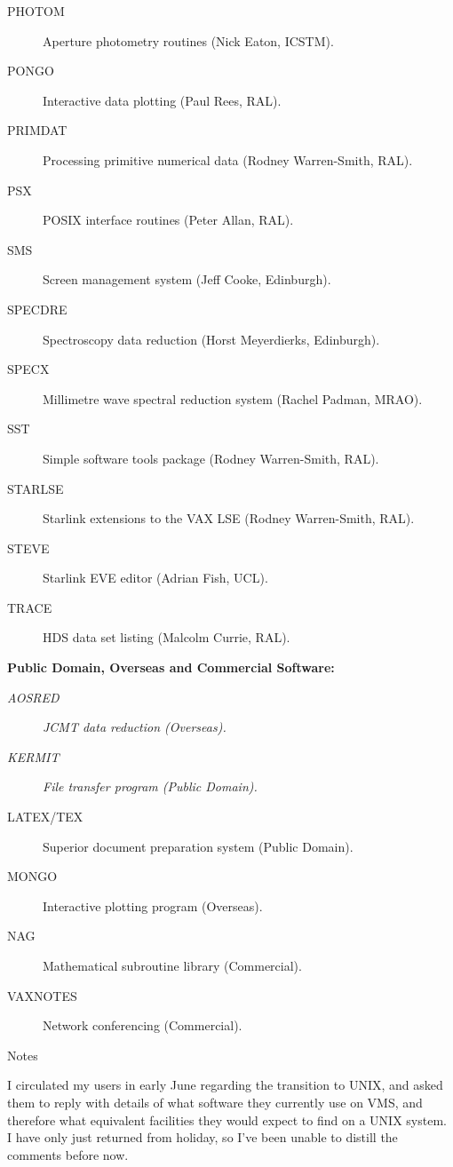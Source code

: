 \begin{description}
\item[PHOTOM] Aperture photometry routines (Nick Eaton, ICSTM).
\item[PONGO] Interactive data plotting (Paul Rees, RAL).
\item[PRIMDAT] Processing primitive numerical data (Rodney Warren-Smith, RAL).
\item[PSX] POSIX interface routines (Peter Allan, RAL).
\item[SMS] Screen management system (Jeff Cooke, Edinburgh).
\item[SPECDRE] Spectroscopy data reduction (Horst Meyerdierks, Edinburgh).
\item[SPECX] Millimetre wave spectral reduction system (Rachel Padman, MRAO).
\item[SST] Simple software tools package (Rodney Warren-Smith, RAL).
\item[STARLSE] Starlink extensions to the VAX LSE (Rodney Warren-Smith, RAL).
\item[STEVE] Starlink EVE editor (Adrian Fish, UCL).
\item[TRACE] HDS data set listing (Malcolm Currie, RAL).
\end{description}


\newpage
\vspace{5mm}
\begin{center}
{\bf Public Domain, Overseas and Commercial Software:}
\end{center}

\begin{description}
\item[{\em AOSRED}] {\em JCMT data reduction (Overseas).}
\item[{\em KERMIT}] {\em File transfer program (Public Domain).}
\item[LATEX/TEX] Superior document preparation system (Public Domain).
\item[MONGO] Interactive plotting program (Overseas).
\item[NAG] Mathematical subroutine library (Commercial).
\item[VAXNOTES] Network conferencing (Commercial).
\end{description}


\vspace{5mm}
\begin{center}
{\large\sc Notes}
\end{center}

I circulated my users in early June regarding the transition to UNIX, and
asked them to reply with details of what software they currently use on VMS,
and therefore what equivalent facilities they would expect to find on a UNIX
system.
I have only just returned from holiday, so I've been unable to
distill the comments before now.

